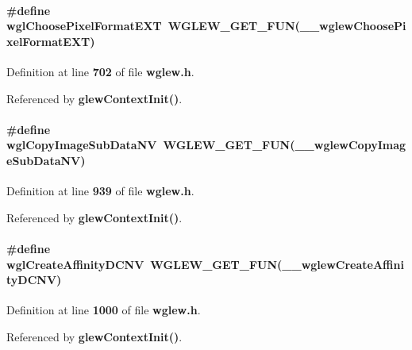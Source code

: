 \paragraph[{wgl\+Choose\+Pixel\+Format\+E\+XT}]{\setlength{\rightskip}{0pt plus 5cm}\#define wgl\+Choose\+Pixel\+Format\+E\+XT~{\bf W\+G\+L\+E\+W\+\_\+\+G\+E\+T\+\_\+\+F\+UN}({\bf \+\_\+\+\_\+wglew\+Choose\+Pixel\+Format\+E\+XT})}\label{wglew_8h_aab686386195282bca80935947b125754}


Definition at line {\bf 702} of file {\bf wglew.\+h}.



Referenced by {\bf glew\+Context\+Init()}.

\paragraph[{wgl\+Copy\+Image\+Sub\+Data\+NV}]{\setlength{\rightskip}{0pt plus 5cm}\#define wgl\+Copy\+Image\+Sub\+Data\+NV~{\bf W\+G\+L\+E\+W\+\_\+\+G\+E\+T\+\_\+\+F\+UN}({\bf \+\_\+\+\_\+wglew\+Copy\+Image\+Sub\+Data\+NV})}\label{wglew_8h_ad6747611d788ea473622cb3f30291ac8}


Definition at line {\bf 939} of file {\bf wglew.\+h}.



Referenced by {\bf glew\+Context\+Init()}.

\paragraph[{wgl\+Create\+Affinity\+D\+C\+NV}]{\setlength{\rightskip}{0pt plus 5cm}\#define wgl\+Create\+Affinity\+D\+C\+NV~{\bf W\+G\+L\+E\+W\+\_\+\+G\+E\+T\+\_\+\+F\+UN}({\bf \+\_\+\+\_\+wglew\+Create\+Affinity\+D\+C\+NV})}\label{wglew_8h_a4fdf3e4c14b9894ab5ae9502e3ba6bb9}


Definition at line {\bf 1000} of file {\bf wglew.\+h}.



Referenced by {\bf glew\+Context\+Init()}.

